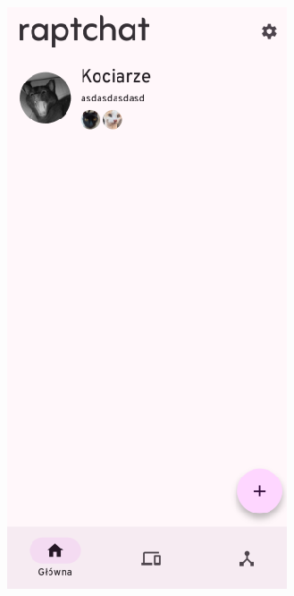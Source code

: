 \clearpage
\begin{figure}[H]
	\centering
	\begin{minipage}[b]{0.45\textwidth}
		\centering
		\includegraphics[width=\textwidth]{root/raptchat_chats_home.png}

\end{minipage}
\end{figure}
